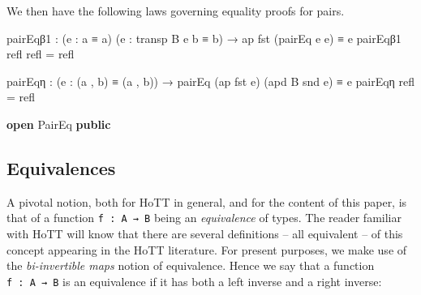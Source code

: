\documentclass[
  11pt,
  oneside,
  article]{memoir}
\newenvironment{Shaded}{}{}
\newcommand{\KeywordTok}[1]{\textcolor[rgb]{0.00,0.44,0.13}{\textbf{#1}}}
\newcommand{\NormalTok}[1]{#1}
\newcommand{\OtherTok}[1]{\textcolor[rgb]{0.00,0.44,0.13}{#1}}
\theoremstyle{definition}
\theoremstyle{plain}
\newcommand{\0}{\textsf{0}}
\newcommand{\1}{\tn{\textsf{1}}}
\begin{document}
We then have the following laws governing equality proofs for pairs.

\begin{Shaded}
\begin{Highlighting}[]
\NormalTok{    pairEqβ1 }\OtherTok{:} \OtherTok{(}\NormalTok{e }\OtherTok{:}\NormalTok{ a ≡ a\textquotesingle{}}\OtherTok{)} \OtherTok{(}\NormalTok{e\textquotesingle{} }\OtherTok{:}\NormalTok{ transp B e b ≡ b\textquotesingle{}}\OtherTok{)} \OtherTok{→}\NormalTok{ ap fst }\OtherTok{(}\NormalTok{pairEq e e\textquotesingle{}}\OtherTok{)}\NormalTok{ ≡ e}
\NormalTok{    pairEqβ1 refl refl }\OtherTok{=}\NormalTok{ refl}

\NormalTok{    pairEqη }\OtherTok{:} \OtherTok{(}\NormalTok{e }\OtherTok{:} \OtherTok{(}\NormalTok{a , b}\OtherTok{)}\NormalTok{ ≡ }\OtherTok{(}\NormalTok{a\textquotesingle{} , b\textquotesingle{}}\OtherTok{))} \OtherTok{→}\NormalTok{ pairEq }\OtherTok{(}\NormalTok{ap fst e}\OtherTok{)} \OtherTok{(}\NormalTok{apd B snd e}\OtherTok{)}\NormalTok{ ≡ e}
\NormalTok{    pairEqη refl }\OtherTok{=}\NormalTok{ refl}

\KeywordTok{open}\NormalTok{ PairEq }\KeywordTok{public}
\end{Highlighting}
\end{Shaded}

\subsection{Equivalences}\label{equivalences}

A pivotal notion, both for HoTT in general, and for the content of this
paper, is that of a function \texttt{f\ :\ A\ →\ B} being an
\emph{equivalence} of types. The reader familiar with HoTT will know
that there are several definitions -- all equivalent -- of this concept
appearing in the HoTT literature. For present purposes, we make use of
the \emph{bi-invertible maps} notion of equivalence. Hence we say that a
function \texttt{f\ :\ A\ →\ B} is an equivalence if it has both a left
inverse and a right inverse:
\end{document}
